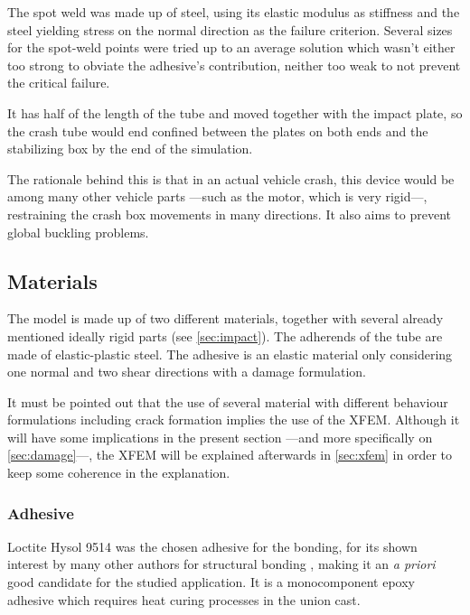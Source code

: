 \documentclass[cmfonts]{witpress}
\begin{document}

The spot weld was made up of steel, using its elastic modulus as stiffness and the steel yielding stress on the normal direction as the failure criterion. Several sizes for the spot-weld points were tried up to an average solution which wasn't either too strong to obviate the adhesive's contribution, neither too weak to not prevent the critical failure.



It has half of the length of the tube and moved together with the impact plate, so the crash tube would end confined between the plates on both ends and the stabilizing box by the end of the simulation. 

The rationale behind this is that in an actual vehicle crash, this device would be among many other vehicle parts ---such as the motor, which is very rigid---, restraining the crash box movements in many directions. It also aims to prevent global buckling problems.

\subsection{Materials}

The model is made up of two different materials, together with several already mentioned ideally rigid parts (see \cref{sec:impact}). The adherends of the tube are made of elastic-plastic steel. The adhesive is an elastic material only considering one normal and two shear directions with a damage formulation.

It must be pointed out that the use of several material with different behaviour formulations including crack formation implies the use of the XFEM. Although it will have some implications in the present section ---and more specifically on \cref{sec:damage}---, the XFEM will be explained afterwards in \cref{sec:xfem} in order to keep some coherence in the explanation.

\subsubsection{Adhesive}
Loctite Hysol 9514 \cite{manufCatalog} was the chosen adhesive for the bonding, for its shown interest by many other authors for structural bonding \cite{Sadowski2010, Scattina2011, SernaMoreno2015}, making it an \textit{a priori} good candidate for the studied application. It is a monocomponent epoxy adhesive which requires heat curing processes in the union cast.
\end{document}
